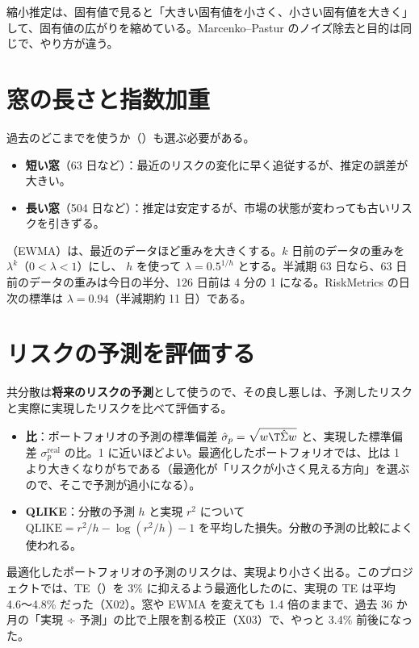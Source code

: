 縮小推定は、固有値で見ると「大きい固有値を小さく、小さい固有値を大きく」して、固有値の広がりを縮めている。Marcenko--Pastur のノイズ除去と目的は同じで、やり方が違う。

\section{窓の長さと指数加重}

過去のどこまでを使うか（）も選ぶ必要がある。

\begin{itemize}
\item \textbf{短い窓}（63 日など）：最近のリスクの変化に早く追従するが、推定の誤差が大きい。
\item \textbf{長い窓}（504 日など）：推定は安定するが、市場の状態が変わっても古いリスクを引きずる。
\end{itemize}

（EWMA）は、最近のデータほど重みを大きくする。$k$ 日前のデータの重みを $\lambda^k$（$0<\lambda<1$）にし、 $h$ を使って $\lambda = 0.5^{1/h}$ とする。半減期 63 日なら、63 日前のデータの重みは今日の半分、126 日前は 4 分の 1 になる。RiskMetrics の日次の標準は $\lambda=0.94$（半減期約 11 日）である。

\section{リスクの予測を評価する}

共分散は\textbf{将来のリスクの予測}として使うので、その良し悪しは、予測したリスクと実際に実現したリスクを比べて評価する。

\begin{itemize}
\item \textbf{比}：ポートフォリオの予測の標準偏差 $\hat\sigma_p = \sqrt{w\T\hat\Sigma w}$ と、実現した標準偏差 $\sigma_p^{\text{real}}$ の比。1 に近いほどよい。最適化したポートフォリオでは、比は 1 より大きくなりがちである（最適化が「リスクが小さく見える方向」を選ぶので、そこで予測が過小になる）。
\item \textbf{QLIKE}：分散の予測 $h$ と実現 $r^2$ について $\text{QLIKE} = r^2/h - \log(r^2/h) - 1$ を平均した損失。分散の予測の比較によく使われる。
\end{itemize}

\begin{notebox}
最適化したポートフォリオの予測のリスクは、実現より小さく出る。このプロジェクトでは、TE（）を 3\% に抑えるよう最適化したのに、実現の TE は平均 4.6〜4.8\% だった（X02）。窓や EWMA を変えても 1.4 倍のままで、過去 36 か月の「実現 ÷ 予測」の比で上限を割る校正（X03）で、やっと 3.4\% 前後になった。
\end{notebox}

